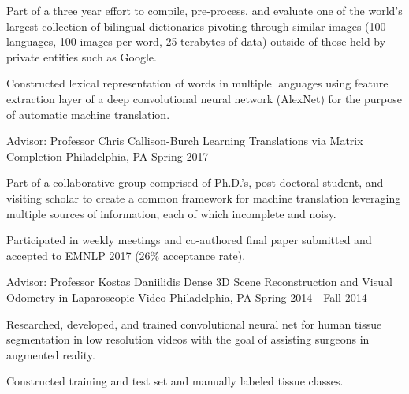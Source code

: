 \begin{cventries}
    {
      \begin{cvitems}
        \item {Part of a three year effort to compile, pre-process, and evaluate one of the world’s largest collection of bilingual dictionaries pivoting through similar images (100 languages, 100 images per word, 25 terabytes of data) outside of those held by private entities such as Google.}
        \item {Constructed lexical representation of words in multiple languages using feature extraction layer of a deep convolutional neural network (AlexNet) for the purpose of automatic machine translation.}
      \end{cvitems} 
    }
  \cventry
    {Advisor: Professor Chris Callison-Burch}
    {Learning Translations via Matrix Completion}
    {Philadelphia, PA}
    {Spring 2017}
    {
      \begin{cvitems}
         \item {Part of a collaborative group comprised of Ph.D.’s, post-doctoral student, and visiting scholar to create a common framework for machine translation leveraging multiple sources of information, each of which incomplete and noisy.}
        \item {Participated in weekly meetings and co-authored final paper submitted and accepted to EMNLP 2017 (26\% acceptance rate).}
      \end{cvitems}
    }
  \cventry
    {Advisor: Professor Kostas Daniilidis}
    {Dense 3D Scene Reconstruction and Visual Odometry in Laparoscopic Video}
    {Philadelphia, PA}
    {Spring 2014 - Fall 2014}
    {
      \begin{cvitems}
        \item {Researched, developed, and trained convolutional neural net for human tissue segmentation in low resolution videos with the goal of assisting surgeons in augmented reality.}
        \item {Constructed training and test set and manually labeled tissue classes.}
      \end{cvitems}
    }
\end{cventries}

